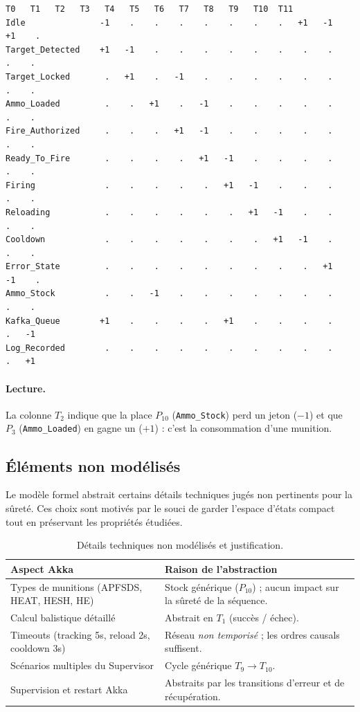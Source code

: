 \documentclass[11pt,a4paper]{article}
\newcommand{\fcs}{\textsc{Fcs}\xspace}
\newcommand{\code}[1]{\texttt{#1}}
\begin{document}
\begin{lstlisting}[basicstyle=\ttfamily\footnotesize,caption={Matrice d'incidence du réseau de Petri du \fcs.}]
                   T0   T1   T2   T3   T4   T5   T6   T7   T8   T9   T10  T11
Idle               -1    .    .    .    .    .    .    .   +1   -1   +1    .
Target_Detected    +1   -1    .    .    .    .    .    .    .    .    .    .
Target_Locked       .   +1    .   -1    .    .    .    .    .    .    .    .
Ammo_Loaded         .    .   +1    .   -1    .    .    .    .    .    .    .
Fire_Authorized     .    .    .   +1   -1    .    .    .    .    .    .    .
Ready_To_Fire       .    .    .    .   +1   -1    .    .    .    .    .    .
Firing              .    .    .    .    .   +1   -1    .    .    .    .    .
Reloading           .    .    .    .    .    .   +1   -1    .    .    .    .
Cooldown            .    .    .    .    .    .    .   +1   -1    .    .    .
Error_State         .    .    .    .    .    .    .    .    .   +1   -1    .
Ammo_Stock          .    .   -1    .    .    .    .    .    .    .    .    .
Kafka_Queue        +1    .    .    .    .   +1    .    .    .    .    .   -1
Log_Recorded        .    .    .    .    .    .    .    .    .    .    .   +1
\end{lstlisting}

\paragraph{Lecture.} La colonne $T_2$ indique que la place $P_{10}$
(\code{Ammo\_Stock}) perd un jeton ($-1$) et que $P_3$ (\code{Ammo\_Loaded})
en gagne un ($+1$) : c'est la consommation d'une munition.

\subsection{Éléments non modélisés}

Le modèle formel abstrait certains détails techniques jugés non pertinents
pour la sûreté. Ces choix sont motivés par le souci de garder l'espace
d'états compact tout en préservant les propriétés étudiées.

\begin{table}[H]
\centering\small
\begin{tabularx}{\linewidth}{l X}
\toprule
\rowcolor{tableheader}\textbf{Aspect Akka} & \textbf{Raison de l'abstraction} \\
\midrule
Types de munitions (APFSDS, HEAT, HESH, HE)
& Stock générique ($P_{10}$) ; aucun impact sur la sûreté de la séquence. \\
Calcul balistique détaillé
& Abstrait en $T_1$ (succès / échec). \\
Timeouts (tracking 5s, reload 2s, cooldown 3s)
& Réseau \emph{non temporisé} ; les ordres causals suffisent. \\
Scénarios multiples du Supervisor
& Cycle générique $T_9 \to T_{10}$. \\
Supervision et restart Akka
& Abstraits par les transitions d'erreur et de récupération. \\
\bottomrule
\end{tabularx}
\caption{Détails techniques non modélisés et justification.}
\end{table}
\end{document}
